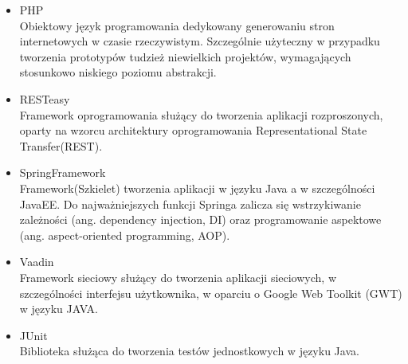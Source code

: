\documentclass[11pt,a4paper,polish,thesis]{dcsbook}
\begin{document}
\begin{itemize}
\item{PHP} \\
Obiektowy język programowania dedykowany generowaniu stron internetowych w czasie rzeczywistym. Szczególnie użyteczny w przypadku tworzenia prototypów tudzież niewielkich projektów, wymagających stosunkowo niskiego poziomu abstrakcji.
\item{RESTeasy} \\
Framework oprogramowania służący do tworzenia aplikacji rozproszonych, oparty na wzorcu architektury oprogramowania Representational State Transfer(REST).
\item{SpringFramework} \\
Framework(Szkielet) tworzenia aplikacji w języku Java a w szczególności JavaEE. Do najważniejszych funkcji Springa zalicza się wstrzykiwanie zależności (ang. dependency injection, DI) oraz programowanie aspektowe (ang. aspect-oriented programming, AOP).  
\item{Vaadin} \\
Framework sieciowy służący do tworzenia aplikacji sieciowych, w szczególności interfejsu użytkownika, w oparciu o Google Web Toolkit (GWT) w języku JAVA.
\item{JUnit} \\
Biblioteka służąca do tworzenia testów jednostkowych w języku Java.
\end{itemize}
\end{document}

